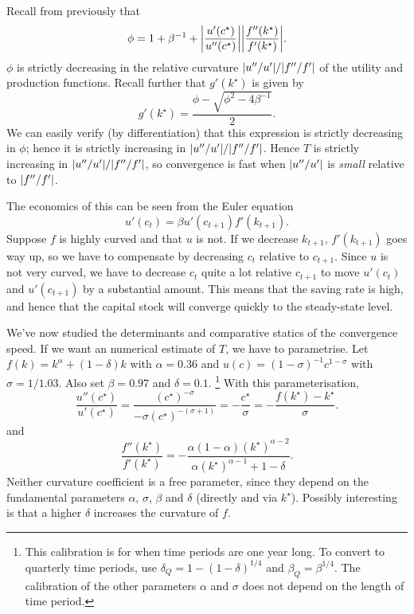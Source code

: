 \documentclass[11pt,letterpaper,reqno,oneside]{article}
\begin{document}
Recall from previously that
%
\begin{equation*}
	\phi = 1 + \beta^{-1} + \abs*{\frac{u'(c^\star)}{u''(c^\star)}} 
	\abs*{\frac{f''(k^\star)}{f'(k^\star)}} .
\end{equation*}
%
$\phi$ is strictly decreasing in the relative curvature $\lvert u''/u'\rvert / \lvert f''/f'\rvert$ of the utility and production functions. Recall further that $g'(k^\star)$ is given by
%
\begin{equation*}
	g'(k^\star) 
	= \frac{ \phi - \sqrt{ \phi^2 - 4 \beta^{-1} } }{ 2 } .
\end{equation*}
%
We can easily verify (by differentiation) that this expression is strictly decreasing in $\phi$; hence it is strictly increasing in $\lvert u''/u'\rvert / \lvert f''/f'\rvert$. Hence $T$ is strictly increasing in $\lvert u''/u'\rvert / \lvert f''/f'\rvert$, so convergence is fast when $\lvert u''/u'\rvert$ is \emph{small} relative to $\lvert f''/f'\rvert$.

The economics of this can be seen from the Euler equation 
%
\begin{equation*}
	u'(c_t) = \beta u'(c_{t+1}) f'(k_{t+1}) .
\end{equation*}
%
Suppose $f$ is highly curved and that $u$ is not. If we decrease $k_{t+1}$, $f'(k_{t+1})$ goes way up, so we have to compensate by decreasing $c_t$ relative to $c_{t+1}$. Since $u$ is not very curved, we have to decrease $c_t$ quite a lot relative $c_{t+1}$ to move $u'(c_t)$ and $u'(c_{t+1})$ by a substantial amount. This means that the saving rate is high, and hence that the capital stock will converge quickly to the steady-state level.


We've now studied the determinants and comparative statics of the convergence speed. If we want an numerical estimate of $T$, we have to parametrise. Let $f(k) = k^\alpha + (1-\delta) k$ with $\alpha = 0.36$ and $u(c) = (1-\sigma)^{-1} c^{1-\sigma}$ with $\sigma = 1/1.03$. Also set $\beta=0.97$ and $\delta=0.1$.%
	\footnote{This calibration is for when time periods are one year long. To convert to quarterly time periods, use $\delta_Q = 1 - (1-\delta)^{1/4}$ and $\beta_Q = \beta^{1/4}$. The calibration of the other parameters $\alpha$ and $\sigma$ does not depend on the length of time period.}
With this parameterisation,
%
\begin{equation*}
	\frac{u''(c^\star)}{u'(c^\star)}
	= \frac{ (c^\star)^{-\sigma} }{ - \sigma (c^\star)^{-(\sigma+1)} } 
	= - \frac{ c^\star }{ \sigma } 
	= - \frac{ f(k^\star) - k^\star }{ \sigma } .
\end{equation*}
%
and
%
\begin{equation*}
	\frac{f''(k^\star)}{f'(k^\star)} 
	= - \frac{ \alpha(1-\alpha) (k^\star)^{\alpha-2} }
	{ \alpha (k^\star)^{\alpha-1} + 1 - \delta } .
\end{equation*}
%
Neither curvature coefficient is a free parameter, since they depend on the fundamental parameters $\alpha$, $\sigma$, $\beta$ and $\delta$ (directly and via $k^\star$). Possibly interesting is that a higher $\delta$ increases the curvature of $f$.
\end{document}
